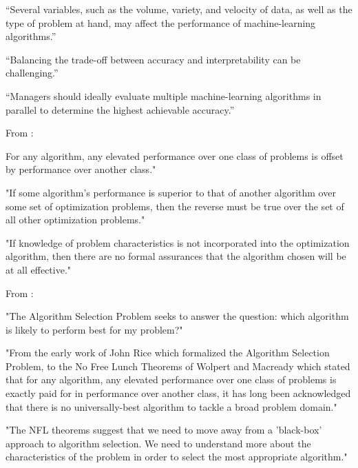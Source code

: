 “Several variables, such as the volume, variety, and velocity of data, as well as the type of problem at hand, may affect the performance of machine-learning algorithms.”

“Balancing the trade-off between accuracy and interpretability can be challenging.”

“Managers should ideally evaluate multiple machine-learning algorithms in parallel to determine the highest achievable accuracy.”

From \parencite{wolpert1997no_free_lunch} :

For any algorithm, any elevated performance over one class of problems is offset by performance over another class."

"If some algorithm's performance is superior to that of another algorithm over some set of optimization problems, then the reverse must be true over the set of all other optimization problems."

"If knowledge of problem characteristics is not incorporated into the optimization algorithm, then there are no formal assurances that the algorithm chosen will be at all effective."

From \parencite{smith_miles2009algorithm_selection} :

"The Algorithm Selection Problem seeks to answer the question: which algorithm is likely to perform best for my problem?"

"From the early work of John Rice which formalized the Algorithm Selection Problem, to the No Free Lunch Theorems of Wolpert and Macready which stated that for any algorithm, any elevated performance over one class of problems is exactly paid for in performance over another class, it has long been acknowledged that there is no universally-best algorithm to tackle a broad problem domain."

"The NFL theorems suggest that we need to move away from a 'black-box' approach to algorithm selection. We need to understand more about the characteristics of the problem in order to select the most appropriate algorithm."